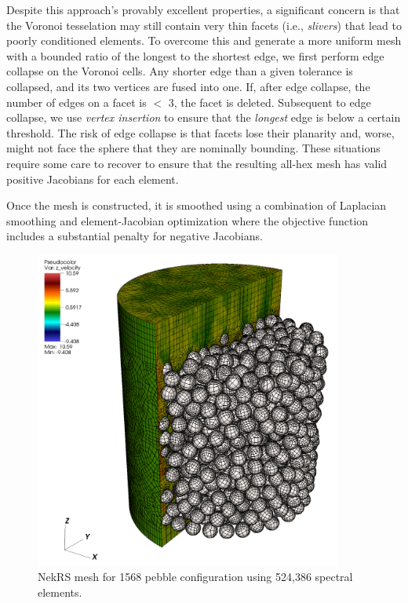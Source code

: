 Despite this approach's provably excellent properties, a significant concern is
that the Voronoi tesselation may still contain very thin facets (i.e., {\em
slivers}) that lead to poorly conditioned elements.  To overcome this and
generate a more uniform mesh with a bounded ratio of the longest to the shortest edge, we first perform edge collapse on the Voronoi cells.  Any shorter edge than a given tolerance is collapsed, and its two vertices are fused into
one.  If, after edge collapse, the number of edges on a facet is $<$ 3, the
facet is deleted.   Subsequent to edge collapse, we use {\em vertex insertion}
to ensure that the {\em longest} edge is below a certain threshold.
The risk of edge collapse is that facets lose their planarity and, worse,
might not face the sphere that they are nominally bounding.
These situations require some care to recover to ensure that the
resulting all-hex mesh has valid positive Jacobians for each element.

Once the mesh is constructed, it is smoothed using a combination of Laplacian
smoothing and element-Jacobian optimization where the objective function
includes a substantial penalty for negative Jacobians.

\begin{figure}[!h]
\centering
\includegraphics[clip=true,width=0.9\textwidth]{Figures/ndemo_r1}
\caption{NekRS mesh for 1568 pebble configuration using 524,386 spectral elements. }
\label{f:ndemo1}
\end{figure}

